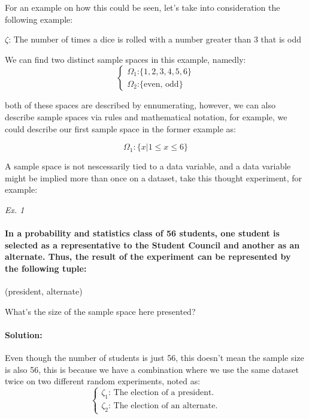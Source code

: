 \documentclass[11pt,fleqn]{book} %
\begin{document}
For an example on how this could be seen, let's take into consideration the following example:

$ \zeta $: The number of times a dice is rolled with a number greater than 3 that is odd

We can find two distinct sample spaces in this example, namedly:
$$
\begin{cases}
    \Omega_1 \text{:} \{ 1,2,3,4,5,6 \} \\
    \Omega_2 \text{:} \{ \text{even, odd} \}    
\end{cases}
$$

both of these spaces are described by ennumerating, however, we can also describe sample spaces via rules and mathematical notation,
for example, we could describe our first sample space in the former example as:

$$ \Omega_1: \{ x | 1 \le x \le 6 \} $$

A sample space is not nescessarily tied to a data variable, and a data variable might be implied more than once on a dataset,
take this thought experiment, for example:

\textit{Ex. 1}

\paragraph*{In a probability and statistics class of 56 students, one student is selected as a representative to the Student Council and another as an alternate. Thus, the result of the experiment can be represented by the following tuple:}
\begin{center}
    (president, alternate)    
\end{center}

What's the size of the sample space here presented?

\paragraph{Solution:}

Even though the number of students is just 56, this doesn't mean the sample size is also
56, this is because we have a combination where we use the same dataset twice on two 
different random experiments, noted as:
$$
\begin{cases}
    \zeta_1 \text{: The election of a president.}\\
    \zeta_2 \text{: The election of an alternate.}
\end{cases}
$$
\end{document}
